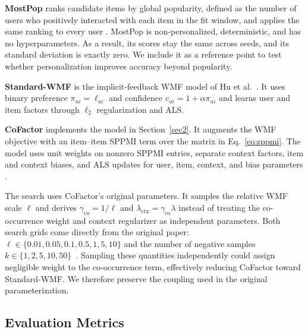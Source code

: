 \documentclass[pdflatex,sn-vancouver-num]{sn-jnl}%
\theoremstyle{thmstyleone}%
\theoremstyle{thmstyletwo}%
\theoremstyle{thmstylethree}%
\begin{document}
\textbf{MostPop} ranks candidate items by global popularity, defined as the number of users who positively interacted with each item in the fit window, and applies the same ranking to every user \cite{aggarwal2016recommender}. MostPop is non-personalized, deterministic, and has no hyperparameters. As a result, its scores stay the same across seeds, and its standard deviation is exactly zero. We include it as a reference point to test whether personalization improves accuracy beyond popularity.

\textbf{Standard-WMF} is the implicit-feedback WMF model of Hu et al.~\cite{hu2008implicit}. It uses binary preference $\pi_{ui}=\ell_{ui}$ and confidence $c_{ui}=1+\alpha\pi_{ui}$ and learns user and item factors through $\ell_2$ regularization and ALS.

\textbf{CoFactor} implements the model in Section~\ref{sec2}. It augments the WMF objective with an item--item SPPMI term over the matrix in Eq.~\eqref{eq:sppmi}. The model uses unit weights on nonzero SPPMI entries, separate context factors, item and context biases, and ALS updates for user, item, context, and bias parameters \cite{liang2016cofactor}.

The search uses CoFactor's original parameters. It samples the relative WMF scale $\ell$ and derives $\gamma_{\mathrm{co}}=1/\ell$ and $\lambda_{\mathrm{ctx}}=\gamma_{\mathrm{co}}\lambda$ instead of treating the co-occurrence weight and context regularizer as independent parameters. Both search grids come directly from the original paper: $\ell\in\{0.01,0.05,0.1,0.5,1,5,10\}$ and the number of negative samples $k\in\{1,2,5,10,50\}$~\cite{liang2016cofactor}. Sampling these quantities independently could assign negligible weight to the co-occurrence term, effectively reducing CoFactor toward Standard-WMF. We therefore preserve the coupling used in the original parameterization.

\subsection{Evaluation Metrics}\label{sec4_metrics}
\end{document}
